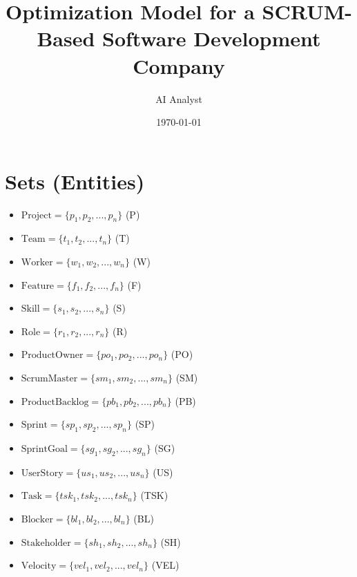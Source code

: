 \documentclass[11pt]{article}
\title{Optimization Model for a SCRUM-Based Software Development Company}
\author{AI Analyst}
\date{\today}
\begin{document}
\maketitle
\tableofcontents
\newpage

\section{Sets (Entities)}
\begin{itemize}
    \item $\text{Project} = \{p_1, p_2, ..., p_n\}$ (P)
    \item $\text{Team} = \{t_1, t_2, ..., t_n\}$ (T)
    \item $\text{Worker} = \{w_1, w_2, ..., w_n\}$ (W)
    \item $\text{Feature} = \{f_1, f_2, ..., f_n\}$ (F)
    \item $\text{Skill} = \{s_1, s_2, ..., s_n\}$ (S)
    \item $\text{Role} = \{r_1, r_2, ..., r_n\}$ (R)
    \item $\text{ProductOwner} = \{po_1, po_2, ..., po_n\}$ (PO)
    \item $\text{ScrumMaster} = \{sm_1, sm_2, ..., sm_n\}$ (SM)
    \item $\text{ProductBacklog} = \{pb_1, pb_2, ..., pb_n\}$ (PB)
    \item $\text{Sprint} = \{sp_1, sp_2, ..., sp_n\}$ (SP)
    \item $\text{SprintGoal} = \{sg_1, sg_2, ..., sg_n\}$ (SG)
    \item $\text{UserStory} = \{us_1, us_2, ..., us_n\}$ (US)
    \item $\text{Task} = \{tsk_1, tsk_2, ..., tsk_n\}$ (TSK)
    \item $\text{Blocker} = \{bl_1, bl_2, ..., bl_n\}$ (BL)
    \item $\text{Stakeholder} = \{sh_1, sh_2, ..., sh_n\}$ (SH)
    \item $\text{Velocity} = \{vel_1, vel_2, ..., vel_n\}$ (VEL)
\end{itemize}
\end{document}
